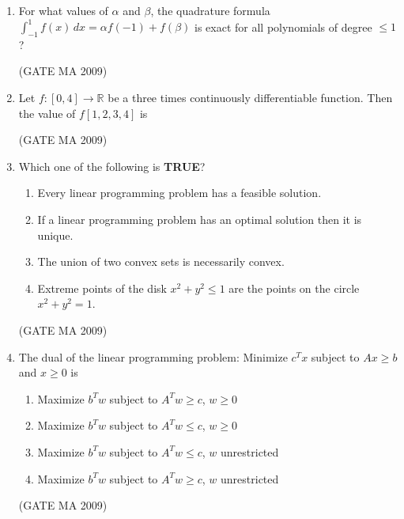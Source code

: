\documentclass[journal,12pt,onecolumn]{IEEEtran}
\theoremstyle{remark}
\begin{document}
\begin{enumerate}
\item For what values of $\alpha$ and $\beta$, the quadrature formula $\int_{-1}^{1} f(x)\,dx = \alpha f(-1) + f(\beta)$ is exact for all polynomials of degree $\leq 1$?
\begin{enumerate}
\end{enumerate}
\hfill (GATE MA 2009)

\item Let $f: [0,4] \to \mathbb{R}$ be a three times continuously differentiable function. Then the value of $f[1,2,3,4]$ is
\begin{enumerate}
\end{enumerate}
\hfill (GATE MA 2009)

\item Which one of the following is \textbf{TRUE}?
\begin{enumerate}
    \item Every linear programming problem has a feasible solution.
    \item If a linear programming problem has an optimal solution then it is unique.
    \item The union of two convex sets is necessarily convex.
    \item Extreme points of the disk $x^2+y^2 \leq 1$ are the points on the circle $x^2+y^2 = 1$.
\end{enumerate}
\hfill (GATE MA 2009)

\item The dual of the linear programming problem: Minimize $c^T x$ subject to $Ax \geq b$ and $x \geq 0$ is
\begin{enumerate}
    \item Maximize $b^T w$ subject to $A^T w \geq c$, $w \geq 0$
    \item Maximize $b^T w$ subject to $A^T w \leq c$, $w \geq 0$
    \item Maximize $b^T w$ subject to $A^T w \leq c$, $w$ unrestricted
    \item Maximize $b^T w$ subject to $A^T w \geq c$, $w$ unrestricted
\end{enumerate}
\hfill (GATE MA 2009)


\end{enumerate}
\end{document}
